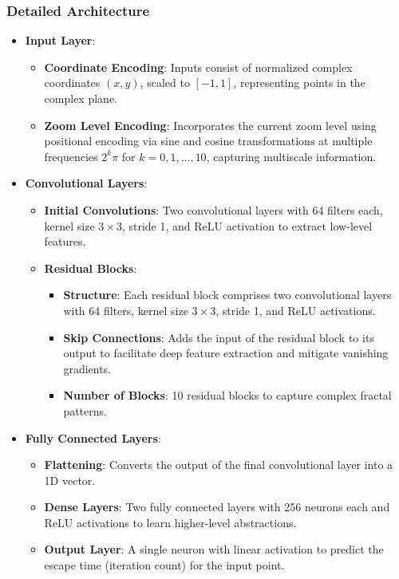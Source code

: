 \documentclass[journal]{IEEEaccess}
\begin{document}
\subsubsection{Detailed Architecture}
\begin{itemize}
    \item \textbf{Input Layer}:
    \begin{itemize}
        \item \textbf{Coordinate Encoding}: Inputs consist of normalized complex coordinates \( (x, y) \), scaled to \([-1, 1]\), representing points in the complex plane.
        \item \textbf{Zoom Level Encoding}: Incorporates the current zoom level using positional encoding via sine and cosine transformations at multiple frequencies \(2^k \pi\) for \(k = 0, 1, \ldots, 10\), capturing multiscale information.
    \end{itemize}
    
    \item \textbf{Convolutional Layers}:
    \begin{itemize}
        \item \textbf{Initial Convolutions}: Two convolutional layers with 64 filters each, kernel size \(3 \times 3\), stride 1, and ReLU activation to extract low-level features.
        \item \textbf{Residual Blocks}:
        \begin{itemize}
            \item \textbf{Structure}: Each residual block comprises two convolutional layers with 64 filters, kernel size \(3 \times 3\), stride 1, and ReLU activations.
            \item \textbf{Skip Connections}: Adds the input of the residual block to its output to facilitate deep feature extraction and mitigate vanishing gradients.
            \item \textbf{Number of Blocks}: 10 residual blocks to capture complex fractal patterns.
        \end{itemize}
    \end{itemize}
    
    \item \textbf{Fully Connected Layers}:
    \begin{itemize}
        \item \textbf{Flattening}: Converts the output of the final convolutional layer into a 1D vector.
        \item \textbf{Dense Layers}: Two fully connected layers with 256 neurons each and ReLU activations to learn higher-level abstractions.
        \item \textbf{Output Layer}: A single neuron with linear activation to predict the escape time (iteration count) for the input point.
    \end{itemize}
    

\end{itemize}
\end{document}
